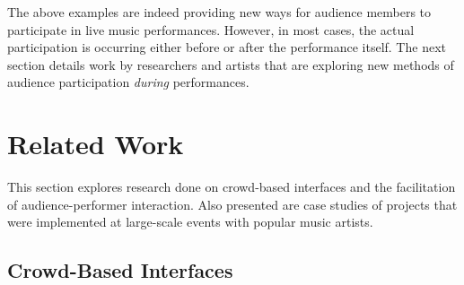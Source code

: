 
The above examples are indeed providing new ways for audience members to participate in live music performances. However, in most cases, the actual participation is occurring either before or after the performance itself. The next section details work by researchers and artists that are exploring new methods of audience participation \textit{during} performances.


\section{Related Work}

This section explores research done on crowd-based interfaces and the facilitation of audience-performer interaction. Also presented are case studies of projects that were implemented at large-scale events with popular music artists.

\subsection{Crowd-Based Interfaces}

